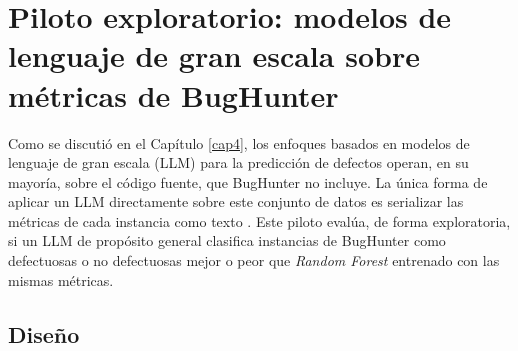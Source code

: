 \section{Piloto exploratorio: modelos de lenguaje de gran escala sobre métricas de BugHunter}
\label{sec:piloto_llm}

Como se discutió en el Capítulo \ref{cap4}, los enfoques basados en modelos de lenguaje de gran escala (LLM) para la predicción de defectos operan, en su mayoría, sobre el código fuente, que BugHunter no incluye. La única forma de aplicar un LLM directamente sobre este conjunto de datos es serializar las métricas de cada instancia como texto \cite{hegselmann2023tabllm}. Este piloto evalúa, de forma exploratoria, si un LLM de propósito general clasifica instancias de BugHunter como defectuosas o no defectuosas mejor o peor que \textit{Random Forest} entrenado con las mismas métricas.

\subsection{Diseño}

